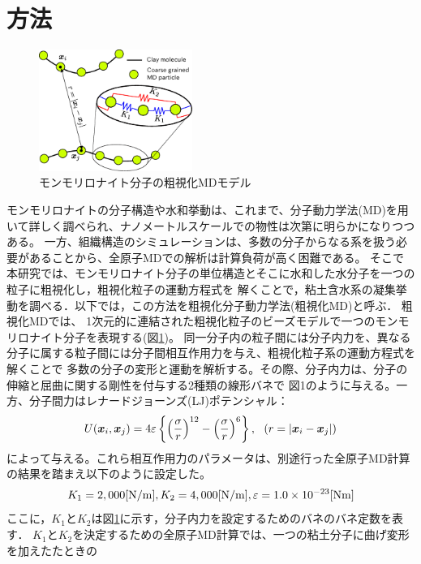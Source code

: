﻿\documentclass[11pt,a4j]{jarticle}
\begin{document}
\section{方法}
\begin{figure}
	\centering
	\includegraphics[keepaspectratio,width=50mm]{Figs/cg_model.eps}
	\caption{モンモリロナイト分子の粗視化MDモデル}
	\label{fig:fig1}
\end{figure}
モンモリロナイトの分子構造や水和挙動は、これまで、分子動力学法(MD)を用いて詳しく調べられ、ナノメートルスケールでの物性は次第に明らかになりつつある\cite{Kawamura}。
一方、組織構造のシミュレーションは、多数の分子からなる系を扱う必要があることから、全原子MDでの解析は計算負荷が高く困難である。
そこで本研究では、モンモリロナイト分子の単位構造とそこに水和した水分子を一つの粒子に粗視化し，粗視化粒子の運動方程式を
解くことで，粘土含水系の凝集挙動を調べる．以下では，この方法を粗視化分子動力学法(粗視化MD)と呼ぶ．
粗視化MDでは、 1次元的に連結された粗視化粒子のビーズモデルで一つのモンモリロナイト分子を表現する(図\ref{fig:fig1})。
同一分子内の粒子間には分子内力を、異なる分子に属する粒子間には分子間相互作用力を与え、粗視化粒子系の運動方程式を解くことで
多数の分子の変形と運動を解析する。その際、分子内力は、分子の伸縮と屈曲に関する剛性を付与する2種類の線形バネで
図1のように与える。一方、分子間力はレナードジョーンズ(LJ)ポテンシャル：
\begin{equation}
	U(\mbox{\boldmath $x$}_i,\mbox{\boldmath $x$}_j)=4\varepsilon
	\left\{ \left(\frac{\sigma}{r}\right)^{12}-
	\left( \frac{\sigma}{r}\right)^6\right\}, 
	\ \ \left(r=\left| \mbox{\boldmath $x$}_i-\mbox{\boldmath $x$}_j\right|\right)
	\label{eqn:LJ}
\end{equation}
によって与える。これら相互作用力のパラメータは、別途行った全原子MD計算の結果を踏まえ以下のように設定した。
\begin{equation}
	K_1  = 2,000[{\rm N / m}],   K_2  = 4,000[{\rm N / m}],  \varepsilon = 1.0\times10^{-23}     [{\rm Nm}]
	\label{eqn:prms}
\end{equation}
ここに，$K_1$と$K_2$は図\ref{fig:fig1}に示す，分子内力を設定するためのバネのバネ定数を表す．
$K_1$と$K_2$を決定するための全原子MD計算では、一つの粘土分子に曲げ変形を加えたたときの
\end{document}
